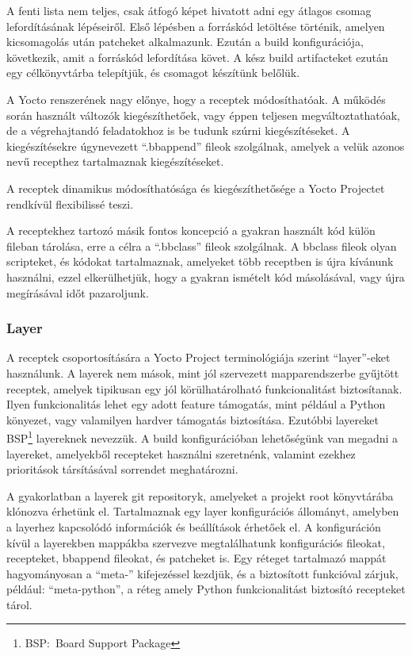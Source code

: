 A fenti lista nem teljes, csak átfogó képet hivatott adni egy átlagos csomag
lefordításának lépéseiről. Első lépésben a forráskód letöltése történik, amelyen
kicsomagolás után patcheket alkalmazunk. Ezután a build konfigurációja,
következik, amit a forráskód lefordítása követ. A kész build artifacteket ezután
egy célkönyvtárba telepítjük, és csomagot készítünk belőlük. 

A Yocto renszerének nagy előnye, hogy a receptek módosíthatóak. A működés során
használt változók kiegészíthetőek, vagy éppen teljesen megváltoztathatóak, de a
végrehajtandó feladatokhoz is be tudunk szúrni kiegészítéseket. A
kiegészítésekre úgynevezett ``.bbappend'' fileok szolgálnak, amelyek a velük
azonos nevű recepthez tartalmaznak kiegészítéseket.

A receptek dinamikus módosíthatósága és kiegészíthetősége a Yocto Projectet
rendkívül flexibilissé teszi.

\medskip

A receptekhez tartozó másik fontos koncepció a gyakran használt kód külön fileban
tárolása, erre a célra a ``.bbclass'' fileok szolgálnak. A bbclass fileok olyan
scripteket, és kódokat tartalmaznak, amelyeket több receptben is újra kívánunk
használni, ezzel elkerülhetjük, hogy a gyakran ismételt kód másolásával, vagy
újra megírásával időt pazaroljunk.

\subsubsection{Layer}

A receptek csoportosítására a Yocto Project terminológiája szerint ``layer''-eket
használunk. A layerek nem mások, mint jól szervezett mapparendszerbe gyűjtött
receptek, amelyek tipikusan egy jól körülhatárolható funkcionalitást
biztosítanak. Ilyen funkcionalitás lehet egy adott feature támogatás, mint
például a Python könyezet, vagy valamilyen hardver támogatás
biztosítása. Ezutóbbi layereket BSP\footnote{BSP:~Board Support Package}
layereknek nevezzük. A build konfigurációban lehetőségünk van megadni a
layereket, amelyekből recepteket használni szeretnénk, valamint ezekhez
prioritások társításával sorrendet meghatározni.

A gyakorlatban a layerek git repositoryk, amelyeket a projekt root könyvtárába
klónozva érhetünk el. Tartalmaznak egy layer konfigurációs állományt, amelyben a
layerhez kapcsolódó információk és beállítások érhetőek el. A konfiguráción kívül
a layerekben mappákba szervezve megtalálhatunk konfigurációs fileokat,
recepteket, bbappend fileokat, és patcheket is. Egy réteget tartalmazó mappát
hagyományosan a ``meta-'' kifejezéssel kezdjük, és a biztosított funkcióval
zárjuk, például: ``meta-python'', a réteg amely Python funkcionalitást biztosító
recepteket tárol. 

